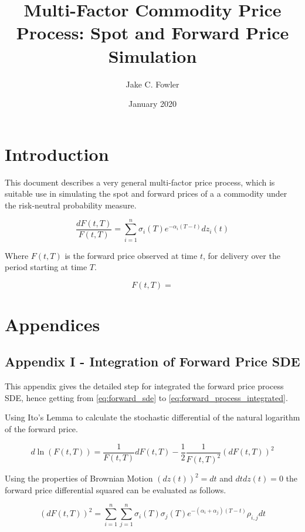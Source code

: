 \documentclass{article}
\title{Multi-Factor Commodity Price Process: Spot and Forward Price Simulation}
\author{Jake C. Fowler}
\date{January 2020}
\begin{document}
\newcommand{\+}[1]{\ensuremath{\mathbf{#1}}}

\maketitle

\section{Introduction}
This document describes a very general multi-factor price process, which is suitable
use in simulating the spot and forward prices of a a commodity under the risk-neutral
probability measure.

\bigskip

\begin{equation}
    \label{eq:forward_sde}
    \frac{dF(t, T)}{F(t, T)}=\sum_{i=1}^n \sigma_i(T)e^{-\alpha_i(T-t)}dz_i(t)
\end{equation}

Where $F(t, T)$ is the forward price observed at time $t$, for delivery over the period
starting at time $T$.

\bigskip

\begin{equation}
    \label{eq:forward_process_integrated}
    F(t, T)=
\end{equation}

\section{Appendices} %
\subsection{Appendix I - Integration of Forward Price SDE}
This appendix gives the detailed step for integrated the forward price process
SDE, hence getting from \ref{eq:forward_sde} to \ref{eq:forward_process_integrated}.

\bigskip

Using Ito's Lemma to calculate the stochastic differential of the natural logarithm
of the forward price.

\begin{equation}
    d\ln(F(t, T)) = \frac{1}{F(t, T)} dF(t, T) - \frac{1}{2}
        \frac{1}{F(t, T)^2} (dF(t, T))^2
\end{equation}

Using the properties of Brownian Motion $(dz(t))^2=dt$ and $dtdz(t)=0$ the forward
price differential squared can be evaluated as follows.

\begin{equation}
    (dF(t, T))^2 = \sum_{i=1}^n \sum_{j=1}^n \sigma_i(T) \sigma_j(T)
    e^{-(\alpha_i + \alpha_j)(T-t)}\rho_{i,j}dt
\end{equation}

\end{document}
